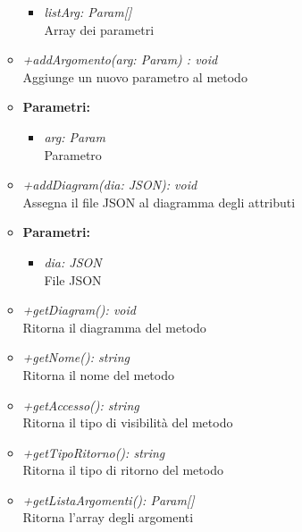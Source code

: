 \begin{itemize}
\begin{itemize}
            				\begin{itemize}
            					\item \emph{listArg: Param[]}\\
            					Array dei parametri
            				\end{itemize}         				
          				\item \emph{+addArgomento(arg: Param) : void}\\
          				Aggiunge un nuovo parametro al metodo
          				\item \textbf{Parametri:}\\
            				\begin{itemize}
            					\item \emph{arg: Param}\\
            					Parametro
            				\end{itemize}          				
          				\item \emph{+addDiagram(dia: JSON): void}\\
          				Assegna il file JSON al diagramma degli attributi
          				\item \textbf{Parametri:}\\
            				\begin{itemize}
            					\item \emph{dia: JSON}\\
            					File JSON
            				\end{itemize}          				
          				\item \emph{+getDiagram(): void}\\
          				Ritorna il diagramma del metodo          				
          				\item \emph{+getNome(): string}\\
          				Ritorna il nome del metodo
          				\item \emph{+getAccesso(): string}\\
          				Ritorna il tipo di visibilità del metodo          				
          				\item \emph{+getTipoRitorno(): string}\\
          				Ritorna il tipo di ritorno del metodo          				
          				\item \emph{+getListaArgomenti(): Param[]}\\
          				Ritorna l'array degli argomenti          				
            		\end{itemize}
          		\end{itemize}

